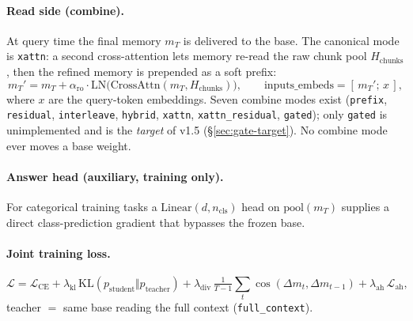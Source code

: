 \documentclass[11pt]{article}
\newcommand{\fullctx}{\texttt{full\_context}}
\newcommand{\code}[1]{\texttt{#1}}
\begin{document}
\paragraph{Read side (combine).} At query time the final memory $m_T$ is
delivered to the base. The canonical mode is \code{xattn}: a second
cross-attention lets memory re-read the raw chunk pool
$H_{\mathrm{chunks}}$, then the refined memory is prepended as a soft
prefix:
\begin{equation}
m_T' = m_T + \alpha_{\mathrm{ro}}\cdot
\mathrm{LN}\!\big(\mathrm{CrossAttn}(m_T,H_{\mathrm{chunks}})\big),
\qquad
\text{inputs\_embeds} = [\,m_T';\, x\,],
\end{equation}
where $x$ are the query-token embeddings. Seven combine modes exist
(\code{prefix}, \code{residual}, \code{interleave}, \code{hybrid},
\code{xattn}, \code{xattn\_residual}, \code{gated}); only \code{gated}
is unimplemented and is the \emph{target} of v1.5
(\S\ref{sec:gate-target}). No combine mode ever moves a base weight.

\paragraph{Answer head (auxiliary, training only).} For categorical
training tasks a $\mathrm{Linear}(d,n_{\mathrm{cls}})$ head on
$\mathrm{pool}(m_T)$ supplies a direct class-prediction gradient that
bypasses the frozen base.

\paragraph{Joint training loss.}
\begin{equation}
\mathcal{L} = \mathcal{L}_{\mathrm{CE}}
+ \lambda_{\mathrm{kl}}\,\mathrm{KL}(p_{\mathrm{student}}\Vert p_{\mathrm{teacher}})
+ \lambda_{\mathrm{div}}\,\tfrac{1}{T-1}\!\sum_t \cos(\Delta m_t,\Delta m_{t-1})
+ \lambda_{\mathrm{ah}}\,\mathcal{L}_{\mathrm{ah}},
\end{equation}
teacher $=$ same base reading the full context (\fullctx{}).
\end{document}
